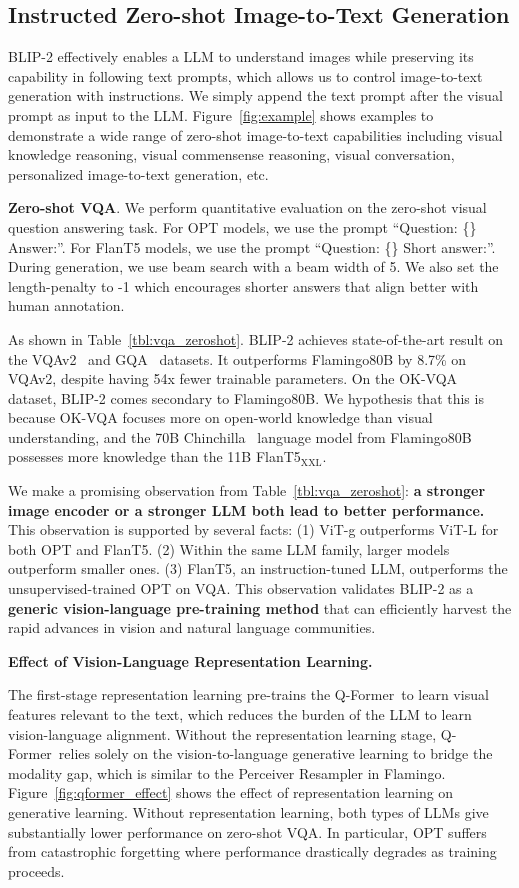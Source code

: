 \subsection{Instructed Zero-shot Image-to-Text Generation}

BLIP-2 effectively enables a LLM to understand images while preserving its capability in following text prompts, which allows us to control image-to-text generation with instructions. We simply append the text prompt after the visual prompt as input to the LLM.
Figure~\ref{fig:example} shows examples to demonstrate a wide range of zero-shot image-to-text capabilities including visual knowledge reasoning, visual commensense reasoning, visual conversation, personalized image-to-text generation, etc.

\textbf{Zero-shot VQA}. We perform quantitative evaluation on the zero-shot visual question answering task. For OPT models, we use the prompt ``Question: {\small\{\}} Answer:''. For FlanT5 models, we use the prompt ``Question: {\small\{\}} Short answer:''. During generation, we use beam search with a beam width of 5. We also set the length-penalty to -1 which encourages shorter answers that align better with human annotation.

As shown in Table~\ref{tbl:vqa_zeroshot}.
BLIP-2 achieves state-of-the-art result on the VQAv2~\cite{VQA2} and GQA~\cite{GQA} datasets. It outperforms Flamingo80B by 8.7\% on VQAv2, despite having 54x fewer trainable parameters. On the OK-VQA~\cite{okvqa} dataset, BLIP-2 comes secondary to Flamingo80B. We hypothesis that this is because OK-VQA focuses more on open-world knowledge than visual understanding, and the 70B Chinchilla~\cite{chinchilla} language model from Flamingo80B possesses more knowledge than the 11B FlanT5$_\text{XXL}$.

We make a promising observation from Table~\ref{tbl:vqa_zeroshot}: 
\textbf{a stronger image encoder or a stronger LLM both lead to better performance.} This observation is supported by several facts: (1) ViT-g outperforms ViT-L for both OPT and FlanT5. (2) Within the same LLM family, larger models outperform smaller ones. (3) FlanT5, an instruction-tuned LLM, outperforms the unsupervised-trained OPT on VQA. This observation validates BLIP-2 as a \textbf{generic vision-language pre-training method} that can efficiently harvest the rapid advances in vision and natural language communities.  

\textbf{Effect of Vision-Language Representation Learning.}

The first-stage representation learning pre-trains the Q-Former~to learn visual features relevant to the text, which reduces the burden of the LLM to learn vision-language alignment. Without the representation learning stage, Q-Former~relies solely on the vision-to-language generative learning to bridge the modality gap, which is similar to the Perceiver Resampler in Flamingo.
Figure~\ref{fig:qformer_effect} shows the effect of representation learning on generative learning. Without representation learning, both types of LLMs give substantially lower performance on zero-shot VQA. In particular, OPT suffers from catastrophic forgetting where performance drastically degrades as training proceeds.

